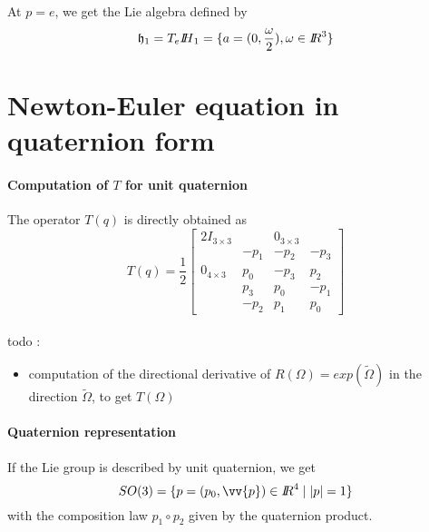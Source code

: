 At $p=e$, we get the Lie algebra defined by
\begin{equation}
  \label{eq:134}
  \mathfrak h_1 =  T_e{\mbox{\rm $I\!\!H$}_1} =  \{ a = (0, \frac \omega 2 ), \omega \in \mbox{\rm $I\!\!R$}^3 \}
\end{equation}
\section{Newton-Euler equation in quaternion  form}


\paragraph{Computation of $T$ for unit quaternion} The operator $T(q)$ is directly obtained as
\begin{equation}
  T(q)=\frac 1 2 \label{eq:98}
  \begin{bmatrix}
    2 I_{3\times 3} & & 0_{3\times 3} & \\
    &   -p_1 & -p_2 & -p_3 \\
    0_{4\times 3}  &  p_0 & -p_3 & p_2 \\
    & p_3 & p_0 & -p_1 \\
    & -p_2 & p_1 & p_0 
  \end{bmatrix}
\end{equation}

\paragraph{}




\begin{ndrva}
  todo :
  \begin{itemize}
  \item computation of the directional derivative of $R(\Omega)= exp(\tilde \Omega)$ in the direction $\tilde\Omega$, to get $T(\Omega)$  
  \end{itemize}
\end{ndrva}

\paragraph{Quaternion representation}If the Lie group is described by unit quaternion, we get
\begin{equation}
  \label{eq:99}
  SO(3) = \{p = (p_0,\vv{p}) \in \RR^{4}\mid |p|=1  \}
\end{equation}
with the composition law  $p_1\circ p_2$ given by the quaternion product.




